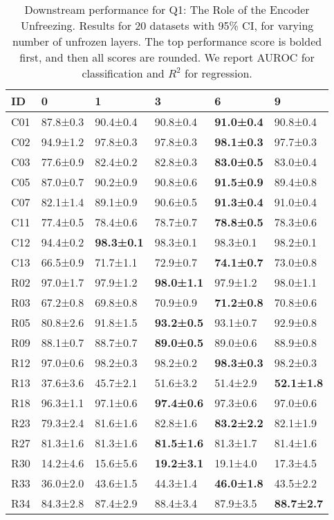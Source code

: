 \begin{table}
\center
\caption{Downstream performance for Q1: The Role of the Encoder Unfreezing. Results for 20 datasets with 95\% CI, for varying number of unfrozen layers. The top performance score is bolded first, and then all scores are rounded. We report AUROC for classification and $R^2$ for regression.}
\label{tab:analysis_e5_downstream}
\begin{tabular}{llllll}
\toprule
ID & 0 & 1 & 3 & 6 & 9 \\
\midrule
C01 & 87.8±0.3 & 90.4±0.4 & 90.8±0.4 & \textbf{91.0±0.4} & 90.8±0.4 \\
C02 & 94.9±1.2 & 97.8±0.3 & 97.8±0.3 & \textbf{98.1±0.3} & 97.7±0.3 \\
C03 & 77.6±0.9 & 82.4±0.2 & 82.8±0.3 & \textbf{83.0±0.5} & 83.0±0.4 \\
C05 & 87.0±0.7 & 90.2±0.9 & 90.8±0.6 & \textbf{91.5±0.9} & 89.4±0.8 \\
C07 & 82.1±1.4 & 89.1±0.9 & 90.6±0.5 & \textbf{91.3±0.4} & 91.0±0.4 \\
C11 & 77.4±0.5 & 78.4±0.6 & 78.7±0.7 & \textbf{78.8±0.5} & 78.3±0.6 \\
C12 & 94.4±0.2 & \textbf{98.3±0.1} & 98.3±0.1 & 98.3±0.1 & 98.2±0.1 \\
C13 & 66.5±0.9 & 71.7±1.1 & 72.9±0.7 & \textbf{74.1±0.7} & 73.0±0.8 \\
R02 & 97.0±1.7 & 97.9±1.2 & \textbf{98.0±1.1} & 97.9±1.2 & 98.0±1.1 \\
R03 & 67.2±0.8 & 69.8±0.8 & 70.9±0.9 & \textbf{71.2±0.8} & 70.8±0.6 \\
R05 & 80.8±2.6 & 91.8±1.5 & \textbf{93.2±0.5} & 93.1±0.7 & 92.9±0.8 \\
R09 & 88.1±0.7 & 88.7±0.7 & \textbf{89.0±0.5} & 89.0±0.6 & 88.9±0.8 \\
R12 & 97.0±0.6 & 98.2±0.3 & 98.2±0.2 & \textbf{98.3±0.3} & 98.2±0.3 \\
R13 & 37.6±3.6 & 45.7±2.1 & 51.6±3.2 & 51.4±2.9 & \textbf{52.1±1.8} \\
R18 & 96.3±1.1 & 97.1±0.6 & \textbf{97.4±0.6} & 97.3±0.6 & 97.0±0.6 \\
R23 & 79.3±2.4 & 81.6±1.6 & 82.8±1.6 & \textbf{83.2±2.2} & 82.1±1.9 \\
R27 & 81.3±1.6 & 81.3±1.6 & \textbf{81.5±1.6} & 81.3±1.7 & 81.4±1.6 \\
R30 & 14.2±4.6 & 15.6±5.6 & \textbf{19.2±3.1} & 19.1±4.0 & 17.3±4.5 \\
R33 & 36.0±2.0 & 43.6±1.5 & 44.3±1.4 & \textbf{46.0±1.8} & 43.5±2.2 \\
R34 & 84.3±2.8 & 87.4±2.9 & 88.4±3.4 & 87.9±3.5 & \textbf{88.7±2.7} \\
\bottomrule
\end{tabular}
\end{table}


